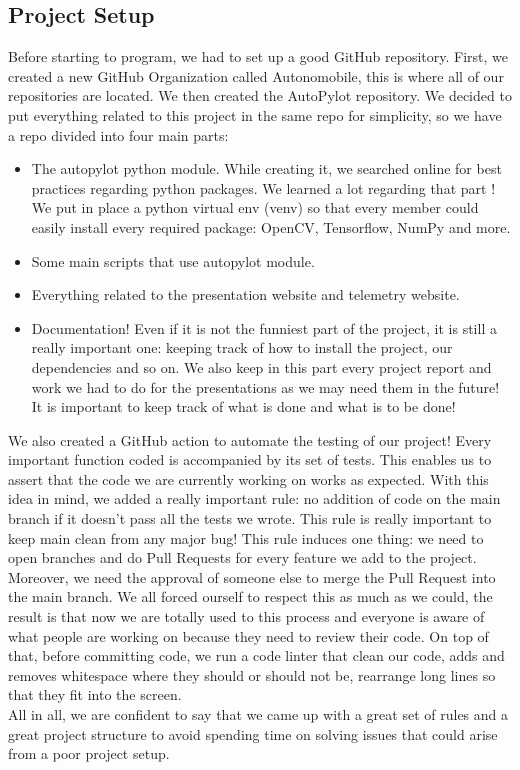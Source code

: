 \documentclass[12pt]{article}
\begin{document}
\subsection{Project Setup}
Before starting to program, we had to set up a good GitHub repository. First, we created a new GitHub Organization called Autonomobile, this is where all of our repositories are located. We then created the AutoPylot repository. We decided to put everything related to this project in the same repo for simplicity, so we have a repo divided into four main parts:
\begin{itemize}
\item The autopylot python module. While creating it, we searched online for best practices regarding python packages. We learned a lot regarding that part ! We put in place a python virtual env (venv) so that every member could easily install every required package: OpenCV, Tensorflow, NumPy and more.
\item Some main scripts that use autopylot module.
\item Everything related to the presentation website and telemetry website.
\item Documentation! Even if it is not the funniest part of the project, it is still a really important one: keeping track of how to install the project, our dependencies and so on. We also keep in this part every project report and work we had to do for the presentations as we may need them in the future! It is important to keep track of what is done and what is to be done!
\end{itemize}
We also created a GitHub action to automate the testing of our project! Every important function coded is accompanied by its set of tests. This enables us to assert that the code we are currently working on works as expected. With this idea in mind, we added a really important rule: no addition of code on the main branch if it doesn't pass all the tests we wrote. This rule is really important to keep main clean from any major bug! This rule induces one thing: we need to open branches and do Pull Requests for every feature we add to the project. Moreover, we need the approval of someone else to merge the Pull Request into the main branch. We all forced ourself to respect this as much as we could, the result is that now we are totally used to this process and everyone is aware of what people are working on because they need to review their code.
On top of that, before committing code, we run a code linter that clean our code, adds and removes whitespace where they should or should not be, rearrange long lines so that they fit into the screen. \\
All in  all, we are confident to say that we came up with a great set of rules and a great project structure to avoid spending time on solving issues that could arise from a poor project setup.
\end{document}
